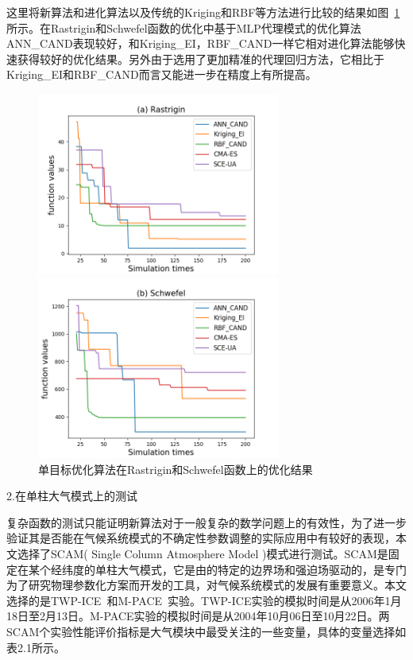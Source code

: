  这里将新算法和进化算法以及传统的Kriging和RBF等方法进行比较的结果如图~\ref{fig:sofuction}所示。在Rastrigin和Schwefel函数的优化中基于MLP代理模式的优化算法ANN\_CAND表现较好，和Kriging\_EI，RBF\_CAND一样它相对进化算法能够快速获得较好的优化结果。另外由于选用了更加精准的代理回归方法，它相比于Kriging\_EI和RBF\_CAND而言又能进一步在精度上有所提高。
\begin{figure}[H]
\centering
\begin{minipage}[t]{0.48\textwidth}
\centering
\includegraphics[width=8cm]{figures/all_Ra4.png}
\end{minipage}
\begin{minipage}[t]{0.48\textwidth}
\centering
\includegraphics[width=8cm]{figures/all_schw4.png}
\end{minipage}
\caption{单目标优化算法在Rastrigin和Schwefel函数上的优化结果}
\label{fig:sofuction}
\end{figure}

   2.在单柱大气模式上的测试
   
复杂函数的测试只能证明新算法对于一般复杂的数学问题上的有效性，为了进一步验证其是否能在气候系统模式的不确定性参数调整的实际应用中有较好的表现，本文选择了SCAM( Single Column Atmosphere Model )模式进行测试。SCAM是固定在某个经纬度的单柱大气模式，它是由的特定的边界场和强迫场驱动的，是专门为了研究物理参数化方案而开发的工具，对气候系统模式的发展有重要意义。本文选择的是TWP-ICE~\cite{lin2012twp}和M-PACE~\cite{verlinde2007mixed}实验。TWP-ICE实验的模拟时间是从2006年1月18日至2月13日。M-PACE实验的模拟时间是从2004年10月06日至10月22日。两SCAM个实验性能评价指标是大气模块中最受关注的一些变量，具体的变量选择如表2.1所示。


